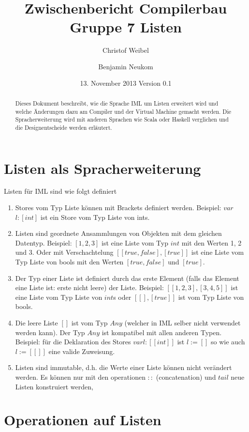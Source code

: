 \documentclass[a4paper,notitlepage,oneside]{scrartcl}
\title{Zwischenbericht Compilerbau Gruppe 7 Listen}
\author{Christof Weibel \and Benjamin Neukom}
\date{13. November 2013 Version 0.1}
\begin{document}
\maketitle

\begin{abstract}
Dieses  Dokument beschreibt, wie die Sprache IML um Listen erweitert wird und welche Änderungen dazu am Compiler und der Virtual Machine gemacht werden. Die Spracherweiterung wird mit anderen Sprachen wie Scala oder Haskell verglichen und die Designentscheide werden erläutert.
\end{abstract}


\section{Listen als Spracherweiterung}
Listen für IML sind wie folgt definiert

\begin{enumerate}
  \item Stores vom Typ Liste können mit Brackets definiert werden. Beispiel: $var$ $l:[int]$ ist ein Store vom Typ Liste von ints.
    
  \item Listen sind geordnete Ansammlungen von Objekten mit dem gleichen Datentyp. Beispiel: $[1,2,3]$ ist eine Liste vom Typ $int$ mit den Werten 1, 2 und 3. Oder mit Verschachtelung $[[true, false], [true]]$ ist eine Liste vom Typ Liste von bools mit den Werten $[true,false]$ und $[true]$.

  \item Der Typ einer Liste ist definiert durch das erste Element (falls das Element eine Liste ist: erste nicht leere) der Liste. Beispiel:  $[[1,2,3],[3,4,5]]$ ist eine Liste vom Typ Liste von $int$s oder $[[], [true]]$ ist vom Typ Liste von bools.

  \item Die leere Liste $[]$ ist vom Typ $Any$ (welcher in IML selber nicht verwendet werden kann). Der Typ $Any$ ist kompatibel mit allen anderen Typen. Beispiel: für die Deklaration des Stores $var l:[[int]]$ ist $l := []$ so wie auch $l := [[]]$ eine valide Zuweisung.

  \item Listen sind immutable, d.h. die Werte einer Liste können nicht verändert werden. Es können nur mit den operationen $::$ (concatenation) und $tail$ neue Listen konstruiert werden,
\end{enumerate} 


\section{Operationen auf Listen}
\end{document}
